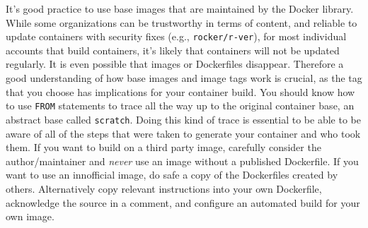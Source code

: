 \documentclass[10pt,letterpaper]{article}
\begin{document}
It's good practice to use base images that are maintained by the Docker
library. While some organizations can be trustworthy in terms of
content, and reliable to update containers with security fixes (e.g.,
\texttt{rocker/r-ver}), for most individual accounts that build
containers, it's likely that containers will not be updated regularly.
It is even possible that images or Dockerfiles disappear. Therefore a
good understanding of how base images and image tags work is crucial, as
the tag that you choose has implications for your container build. You
should know how to use \texttt{FROM} statements to trace all the way up
to the original container base, an abstract base called
\texttt{scratch}. Doing this kind of trace is essential to be able to be
aware of all of the steps that were taken to generate your container and
who took them. If you want to build on a third party image, carefully
consider the author/maintainer and \emph{never} use an image without a
published Dockerfile. If you want to use an innofficial image, do safe a
copy of the Dockerfiles created by others. Alternatively copy relevant
instructions into your own Dockerfile, acknowledge the source in a
comment, and configure an automated build for your own image.
\end{document}
